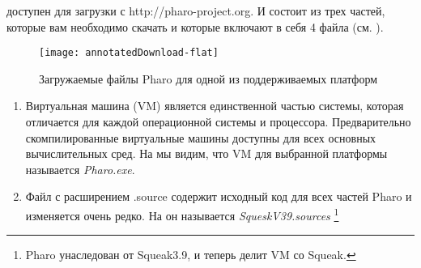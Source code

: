 \documentclass[a4paper,10pt,twoside]{book}
\begin{document}
\pharo доступен для загрузки с http://pharo-project.org.
И состоит из трех частей, которые вам необходимо скачать и
которые включают в себя 4 файла (см. ).

\begin{figure}[htb]
\centerline {\texttt{[image: annotatedDownload-flat]}}
\caption{Загружаемые файлы Pharo для одной из поддерживаемых
платформ }
\end{figure}

\begin{enumerate}


\item Виртуальная машина (VM) является единственной частью системы,
которая отличается для каждой операционной системы  и процессора.
Предварительно скомпилированные виртуальные машины доступны
для всех основных вычислительных сред. На  мы
видим, что VM для выбранной платформы  называется \textit{Pharo.exe}. 


\item Файл с расширением .source
содержит исходный код для всех частей Pharo и
изменяется очень редко. На  он называется
\emph{SqueskV39.sources}
\footnote{Pharo унаследован от  Squeak3.9, и теперь делит VM со Squeak.}



\end{enumerate}
\end{document}
